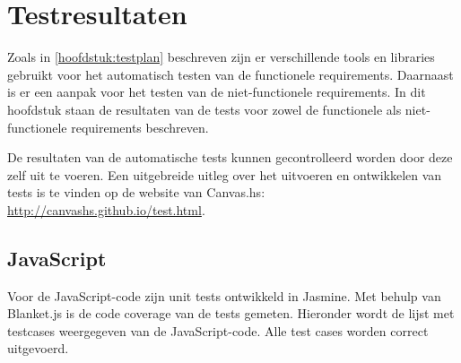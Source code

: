 \section{Testresultaten} \label{sec:testresultaten}
Zoals in \autoref{hoofdstuk:testplan} beschreven zijn er verschillende tools en libraries gebruikt voor het automatisch testen van de functionele requirements. Daarnaast is er een aanpak voor het testen van de niet-functionele requirements. In dit hoofdstuk staan de resultaten van de tests voor zowel de functionele als niet-functionele requirements beschreven.

De resultaten van de automatische tests kunnen gecontrolleerd worden door deze zelf uit te voeren. Een uitgebreide uitleg over het uitvoeren en ontwikkelen van tests is te vinden op de website van Canvas.hs: \url{http://canvashs.github.io/test.html}.

\subsection{JavaScript}
Voor de JavaScript-code zijn unit tests ontwikkeld in Jasmine. Met behulp van Blanket.js is de code coverage van de tests gemeten. Hieronder wordt de lijst met testcases weergegeven van de JavaScript-code. Alle test cases worden correct uitgevoerd.

